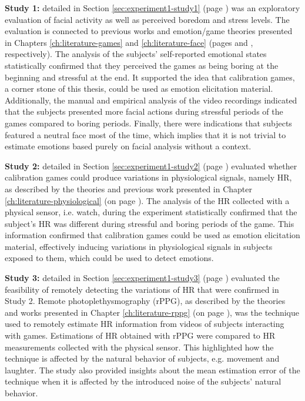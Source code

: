 \textbf{Study 1:} detailed in Section \ref{sec:experiment1-study1} (page \pageref{sec:experiment1-study1}) was an exploratory evaluation of facial activity as well as perceived boredom and stress levels. The evaluation is connected to previous works and emotion/game theories presented in Chapters \ref{ch:literature-games} and \ref{ch:literature-face} (pages \pageref{ch:literature-games} and \pageref{ch:literature-face}, respectively). The analysis of the subjects' self-reported emotional states statistically confirmed that they perceived the games as being boring at the beginning and stressful at the end. It supported the idea that calibration games, a corner stone of this thesis, could be used as emotion elicitation material. Additionally, the manual and empirical analysis of the video recordings indicated that the subjects presented more facial actions during stressful periods of the games compared to boring periods. Finally, there were indications that subjects featured a neutral face most of the time, which implies that it is not trivial to estimate emotions based purely on facial analysis without a context.

\textbf{Study 2:} detailed in Section \ref{sec:experiment1-study2} (page \pageref{sec:experiment1-study2}) evaluated whether calibration games could produce variations in physiological signals, namely HR, as described by the theories and previous work presented in Chapter \ref{ch:literature-physiological} (on page \pageref{ch:literature-physiological}). The analysis of the HR collected with a physical sensor, i.e. watch, during the experiment statistically confirmed that the subject's HR was different during stressful and boring periods of the game. This information confirmed that calibration games could be used as emotion elicitation material, effectively inducing variations in physiological signals in subjects exposed to them, which could be used to detect emotions.

\textbf{Study 3:} detailed in Section \ref{sec:experiment1-study3} (page \pageref{sec:experiment1-study3}) evaluated the feasibility of remotely detecting the variations of HR that were confirmed in Study 2. Remote photoplethysmography (rPPG), as described by the theories and works presented in Chapter \ref{ch:literature-rppg} (on page \pageref{ch:literature-rppg}), was the technique used to remotely estimate HR information from videos of subjects interacting with games. Estimations of HR obtained with rPPG were compared to HR measurements collected with the physical sensor. This highlighted how the technique is affected by the natural behavior of subjects, e.g. movement and laughter. The study also provided insights about the mean estimation error of the technique when it is affected by the introduced noise of the subjects' natural behavior.

